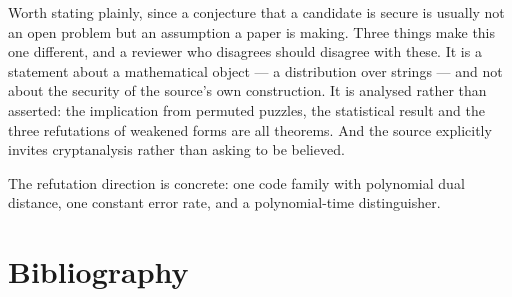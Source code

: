 \documentclass{aicr-conjecture}
\begin{document}
\begin{remark}\label{rem:assumption}
Worth stating plainly, since a conjecture that a candidate is secure is
usually not an open problem but an assumption a paper is making. Three
things make this one different, and a reviewer who disagrees should
disagree with these. It is a statement about a mathematical object --- a
distribution over strings --- and not about the security of the source's
own construction. It is analysed rather than asserted: the implication
from permuted puzzles, the statistical result and the three refutations
of weakened forms are all theorems. And the source explicitly invites
cryptanalysis rather than asking to be believed.

The refutation direction is concrete: one code family with polynomial
dual distance, one constant error rate, and a polynomial-time
distinguisher.
\end{remark}

\section{Bibliography}
\end{document}
